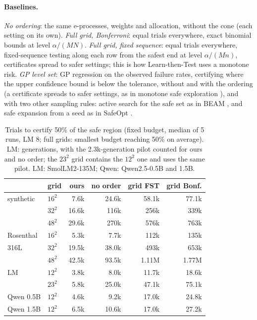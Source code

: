 \documentclass{article}
\begin{document}
\paragraph{Baselines.} \emph{No ordering}: the same e-processes, weights
and allocation, without the cone (each setting on its own). \emph{Full
grid, Bonferroni}: equal trials everywhere, exact binomial bounds at level
$\alpha/(MN)$. \emph{Full grid, fixed sequence}: equal trials everywhere,
fixed-sequence testing along each row from the safest end at level
$\alpha/(M n)$, certificates spread to safer settings; this is how
Learn-then-Test uses a monotone risk. \emph{GP level set}: GP regression
on the observed failure rates, certifying where the upper confidence bound
is below the tolerance, without and with the ordering (a certificate
spreads to safer settings, as in monotone safe exploration
\citep{losalka2023monotone}), and with two other sampling rules:
active search for the safe set as in BEAM \citep{beam2026}, and safe
expansion from a seed as in SafeOpt \citep{sui2015safeopt}.

\begin{table}[t]
\centering\small
\caption{Trials to certify 50\% of the safe region (fixed budget, median of
5 runs, LM 8; full grids: smallest budget reaching 50\% on average). LM:
generations, with the 2.3k-generation pilot counted for ours and no
order; the $23^2$ grid contains the $12^2$ one and uses the same pilot.
LM: SmolLM2-135M; Qwen: Qwen2.5-0.5B and 1.5B.}
\label{tab:scaling}
\setlength{\tabcolsep}{4.5pt}
\begin{tabular}{llrrrr}
\toprule
 & grid & ours & no order & grid FST & grid Bonf. \\
\midrule
synthetic & $16^2$ & 7.6k & 24.6k & 58.1k & 77.1k \\
          & $32^2$ & 16.6k & 116k & 256k & 339k \\
          & $48^2$ & 29.6k & 270k & 576k & 763k \\
Rosenthal & $16^2$ & 5.3k & 7.7k & 112k & 135k \\
316L      & $32^2$ & 19.5k & 38.0k & 493k & 653k \\
          & $48^2$ & 42.5k & 93.5k & 1.11M & 1.77M \\
\midrule
LM        & $12^2$ & 3.8k & 8.0k & 11.7k & 18.6k \\
          & $23^2$ & 5.8k & 25.0k & 47.1k & 75.1k \\
Qwen 0.5B & $12^2$ & 4.6k & 9.2k & 17.0k & 24.8k \\
Qwen 1.5B & $12^2$ & 6.5k & 10.6k & 17.0k & 27.2k \\
\bottomrule
\end{tabular}
\end{table}
\end{document}
